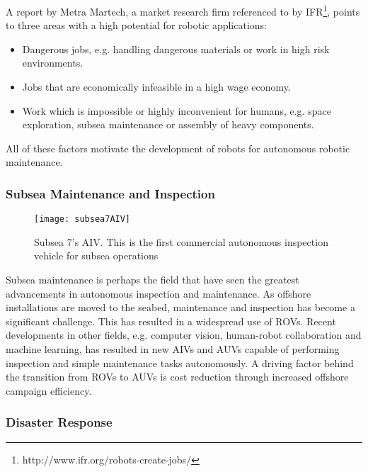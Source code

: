 A report by Metra Martech\cite{metraMartechGorle}, a market research firm referenced to by \ac{IFR}\footnote{http://www.ifr.org/robots-create-jobs/}, points to three areas with a high potential for robotic applications:

\begin{itemize}
	\item Dangerous jobs, e.g. handling dangerous materials or work in high risk environments.
	\item Jobs that are economically infeasible in a high wage economy.
	\item Work which is impossible or highly inconvenient for humans, e.g. space exploration, subsea maintenance or assembly of heavy components.
\end{itemize}

All of these factors motivate the development of robots for autonomous robotic maintenance. 

\subsubsection{Subsea Maintenance and Inspection}

\begin{wrapfigure}{r}{0.5\textwidth}
	\vspace{-20pt}
	\begin{center}
		\texttt{[image: subsea7AIV]}
	\end{center}
	
	\caption{Subsea 7's AIV. This is the first commercial autonomous inspection vehicle for subsea operations \cite{pressAIV}}
\end{wrapfigure}

Subsea maintenance is perhaps the field that have seen the greatest advancements in autonomous inspection and maintenance. As offshore installations are moved to the seabed, maintenance and inspection has become a significant challenge. This has resulted in a widespread use of \acp{ROV}. Recent developments in other fields, e.g. computer vision, human-robot collaboration and machine learning, has resulted in new \acp{AIV} and \acp{AUV} capable of performing inspection and simple maintenance tasks autonomously\cite{subseaAIV}\cite{Ridao2015227}. A driving factor behind the transition from \acp{ROV} to \acp{AUV} is cost reduction through increased offshore campaign efficiency.

\subsubsection{Disaster Response}

